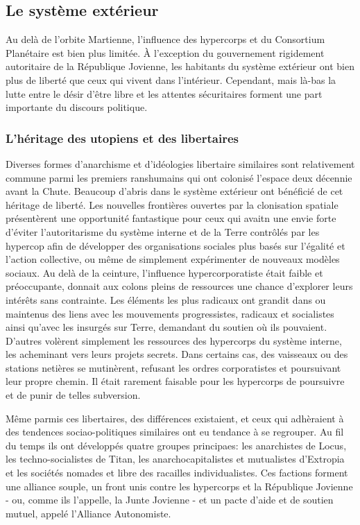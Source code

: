\subsection{Le système extérieur} \label{sec:outer-system} 

Au delà de l'orbite Martienne, l'influence des hypercorps et du Consortium Planétaire est bien plus limitée. À l'exception du gouvernement rigidement autoritaire de la République Jovienne, les habitants du système extérieur ont bien plus de liberté que ceux qui vivent dans l'intérieur. Cependant, mais là-bas la lutte entre le désir d'être libre et les attentes sécuritaires forment une part importante du discours politique. 

\subsubsection{L'héritage des utopiens et des libertaires} \label{sec:libert-utop-legac} 

Diverses formes d'anarchisme et d'idéologies libertaire similaires sont relativement commune parmi les premiers ranshumains qui ont colonisé l'espace deux décennie avant la Chute. Beaucoup d'abris dans le système extérieur ont bénéficié de cet héritage de liberté. Les nouvelles frontières ouvertes par la clonisation spatiale présentèrent une opportunité fantastique pour ceux qui avaitn une envie forte d'éviter l'autoritarisme du système interne et de la Terre contrôlés par les hypercop afin de développer des organisations sociales plus basés sur l'égalité et l'action collective, ou même de simplement expérimenter de nouveaux modèles sociaux. Au delà de la ceinture, l'influence hypercorporatiste était faible et préoccupante, donnait aux colons pleins de ressources  une chance d'explorer leurs intérêts sans contrainte. Les éléments les plus radicaux ont grandit dans ou maintenus des liens avec les mouvements progressistes, radicaux et socialistes ainsi qu'avec les insurgés sur Terre, demandant du soutien où ils pouvaient. D'autres volèrent simplement les ressources des hypercorps du système interne, les acheminant vers leurs projets secrets. Dans certains cas, des vaisseaux ou des stations netières se mutinèrent, refusant les ordres corporatistes et poursuivant leur propre chemin. Il était rarement faisable pour les hypercorps de poursuivre et de punir de telles subversion. 

Même parmis ces libertaires, des différences existaient, et ceux qui adhèraient à des tendences sociao-politiques similaires ont eu tendance à se regrouper. Au fil du temps ils ont développés quatre groupes principaes: les anarchistes de Locus, les techno-socialistes de Titan, les anarchocapitalistes et mutualistes d'Extropia et les sociétés nomades et libre des racailles individualistes. Ces factions forment une alliance souple, un front unis contre les hypercorps et la République Jovienne - ou, comme ils l'appelle, la Junte Jovienne - et un pacte d'aide et de soutien mutuel, appelé l'Alliance Autonomiste. 

